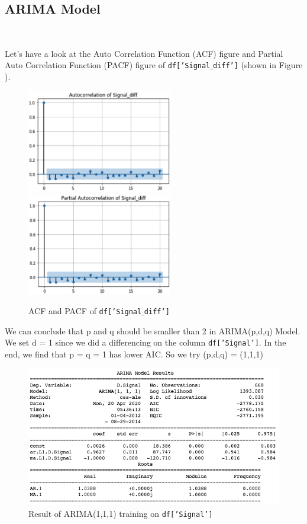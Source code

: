 \documentclass[11pt, oneside]{article}   	%
\begin{document}
\subsection{ARIMA Model}

\

Let's have a look at the Auto Correlation Function (ACF) figure and Partial Auto Correlation Function (PACF) figure of  \texttt{df['Signal$\_$diff']}  (shown in Figure ).
\begin{figure}[htbp]
   \centering
   \includegraphics[width = 2.5in]{acfdiff.png} 
    \includegraphics[width = 2.5in]{acfdiff2.png}
   \caption{ ACF and PACF of \texttt{df['Signal$\_$diff']}}
\end{figure}

We can conclude that p  and q should be smaller than 2 in ARIMA(p,d,q) Model. We set d = 1 since we did a differencing on the column \texttt{df['Signal']}. In the end, we find that p = q = 1 has lower AIC. So we try (p,d,q) = (1,1,1)
\begin{figure}[htbp]
   \centering
   \includegraphics[width = 5in]{amira1.png} 
       \caption{Result of ARIMA(1,1,1) training on \texttt{df['Signal']}}
\end{figure}
\end{document}
